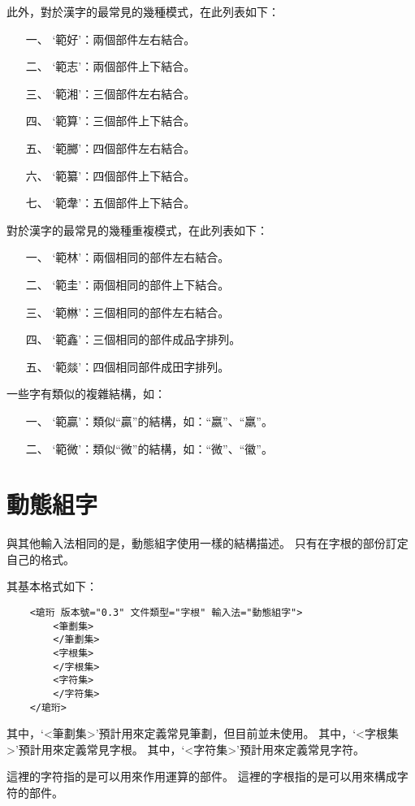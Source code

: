 此外，對於漢字的最常見的幾種模式，在此列表如下：
\begin{enumerate}
\item[一、]`範好'：兩個部件左右結合。
\item[二、]`範志'：兩個部件上下結合。
\item[三、]`範湘'：三個部件左右結合。
\item[四、]`範算'：三個部件上下結合。
\item[五、]`範膷'：四個部件左右結合。
\item[六、]`範纂'：四個部件上下結合。
\item[七、]`範舝'：五個部件上下結合。
\end{enumerate}

對於漢字的最常見的幾種重複模式，在此列表如下：
\begin{enumerate}
\item[一、]`範林'：兩個相同的部件左右結合。
\item[二、]`範圭'：兩個相同的部件上下結合。
\item[三、]`範㴇'：三個相同的部件左右結合。
\item[四、]`範鑫'：三個相同的部件成品字排列。
\item[五、]`範燚'：四個相同部件成田字排列。
\end{enumerate}

一些字有類似的複雜結構，如：
\begin{enumerate}
\item[一、]`範贏'：類似``贏''的結構，如：``嬴''、``羸''。
\item[二、]`範微'：類似``微''的結構，如：``微''、``徽''。
\end{enumerate}



\section{動態組字}
與其他輸入法相同的是，動態組字使用一樣的結構描述。
只有在字根的部份訂定自己的格式。

其基本格式如下：
\listXML\begin{lstlisting}
	<瑲珩 版本號="0.3" 文件類型="字根" 輸入法="動態組字">
		<筆劃集>
		</筆劃集>
		<字根集>
		</字根集>
		<字符集>
		</字符集>
	</瑲珩>
\end{lstlisting}
其中，`<筆劃集>'預計用來定義常見筆劃，但目前並未使用。
其中，`<字根集>'預計用來定義常見字根。
其中，`<字符集>'預計用來定義常見字符。

這裡的字符指的是可以用來作用運算的部件。
這裡的字根指的是可以用來構成字符的部件。

